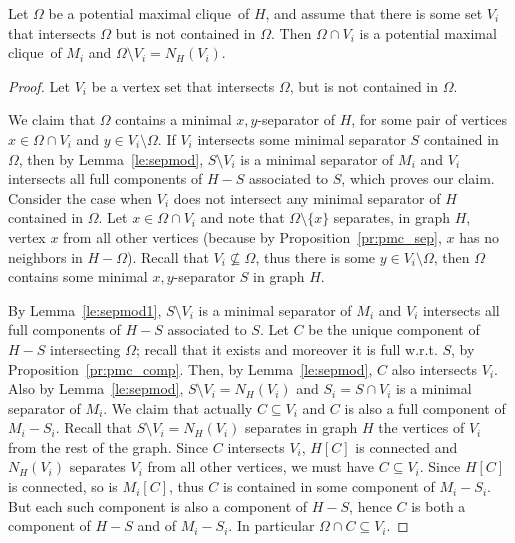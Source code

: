 \documentclass{llncs}
\newcommand{\pmc}{potential maximal clique}
\begin{document}
\begin{lemma}\label{le:pmcmod}
Let $\Omega$ be a \pmc\ of $H$, and assume that there is some set $V_i$ that intersects $\Omega$ but is not contained in $\Omega$. Then $\Omega \cap V_i$ is a \pmc\ of $M_i$ and $\Omega \setminus V_i = N_H(V_i)$.
\end{lemma}
\begin{proof}
Let $V_i$ be a vertex set that intersects $\Omega$, but is not contained in $\Omega$. 

We claim that $\Omega$ contains a minimal $x,y$-separator of $H$, for some pair of vertices $x \in \Omega \cap V_i$ and $y \in V_i \setminus \Omega$. If $V_i$ intersects some minimal separator $S$ contained in $\Omega$, then by Lemma~\ref{le:sepmod}, $S \setminus V_i$ is a minimal separator of $M_i$ and $V_i$ intersects all full components of $H - S$ associated to $S$, which proves our claim. Consider the case when $V_i$ does not intersect any minimal separator of $H$ contained in $\Omega$. Let $x \in \Omega \cap V_i$ and note that $\Omega \setminus \{x\}$ separates, in graph $H$, vertex $x$ from all other vertices (because by Proposition~\ref{pr:pmc_sep}, $x$ has no neighbors in $H - \Omega$). Recall that $V_i \not\subseteq \Omega$, thus there is some $y \in V_i \setminus \Omega$, then $\Omega$ contains some minimal $x,y$-separator $S$ in graph $H$.


By Lemma~\ref{le:sepmod1}, $S \setminus V_i$ is a minimal separator of $M_i$ and $V_i$ intersects all full components of $H - S$ associated to $S$. Let $C$ be the unique component of $H - S$ intersecting $\Omega$; recall that it exists and moreover it is full w.r.t. $S$, by Proposition~\ref{pr:pmc_comp}. Then, by Lemma~\ref{le:sepmod}, $C$ also intersects $V_i$. Also by Lemma~\ref{le:sepmod}, $S \setminus V_i = N_H(V_i)$ and $S_i = S \cap V_i$ is a minimal separator of $M_i$. We claim that actually $C \subseteq V_i$ and $C$ is also a full component of $M_i - S_i$. Recall that $S \setminus V_i = N_H(V_i)$ separates in graph $H$ the vertices of $V_i$ from the rest of the graph. Since $C$ intersects $V_i$, $H[C]$ is connected and $N_H(V_i)$ separates $V_i$ from all other vertices, we must have $C \subseteq V_i$. Since $H[C]$ is connected, so is $M_i[C]$, thus $C$ is contained in some component of $M_i - S_i$. But each such component is also a component of $H - S$, hence $C$ is both a component of $H-S$ and of $M_i - S_i$. In particular $\Omega \cap C \subseteq V_i$.


\end{proof}
\end{document}
